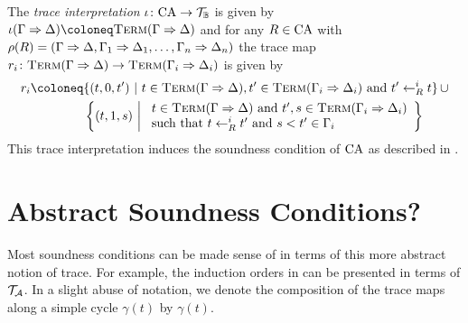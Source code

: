 \begin{definition}
  The \emph{trace interpretation} $\iota \colon \mathrm{CA} \to \mathcal{T}_{\mathbb{B}}$ is given by $\iota(\Gamma
  \sdash \Delta) \coloneq \term(\Gamma \sdash \Delta)$ and for any $R \in \mathrm{CA}$
  with $\rho(R) = (\Gamma \Rightarrow \Delta, \Gamma_1 \Rightarrow \Delta_1, \ldots,
  \Gamma_n \Rightarrow \Delta_n)$ the trace map $r_i \colon \textsc{Term}(\Gamma \Rightarrow \Delta) \to
  \textsc{Term}(\Gamma_i \Rightarrow \Delta_i)$ is given by
  \begin{align*}
    r_i \coloneq & \{(t, 0, t') ~|~ t \in \term(\Gamma \sdash \Delta), t' \in \term(\Gamma_i
                   \sdash \Delta_i) \text{ and } t' \leftarrow^i_R t\} \,\cup \\
                 & \left\{(t, 1, s) ~\middle|~
                   \begin{array}{l}
                     t \in \term(\Gamma \sdash \Delta) \text{ and } t', s \in \term(\Gamma_i \sdash \Delta_i) \\
                     \text{such that } t \leftarrow^i_R t' \text{ and } s < t' \in \Gamma_i
                   \end{array}
                   \right\}
  \end{align*}
  This trace interpretation induces the soundness condition of $\mathrm{CA}$ as described in
  .
\end{definition}

\section{Abstract Soundness Conditions?}
\label{sec:asc}

Most soundness conditions
can be
made sense of in terms of this more abstract notion of trace. For example, the
induction orders in  can be presented in terms of $\mathcal{T}_{\mathcal{A}}$.
In a slight abuse of notation, we denote the composition of the trace maps along
a simple cycle $\gamma(t)$ by $\gamma(t)$.

